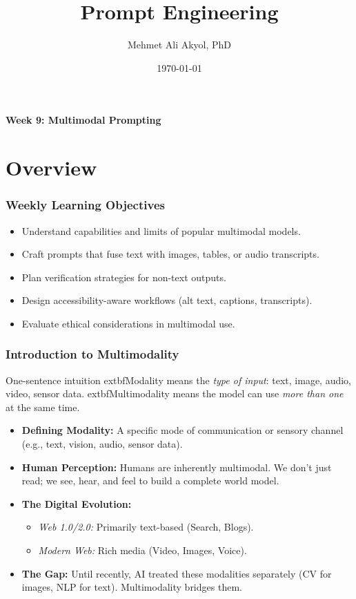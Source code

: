\documentclass{beamer}
\title{Prompt Engineering}
\author{Mehmet Ali Akyol, PhD}
\institute{Ankara Medipol University}
\date{\today}
\begin{document}
\begin{frame}
    \titlepage
    \begin{center}
        \vspace{1cm}
        \textbf{Week 9: Multimodal Prompting}
    \end{center}
\end{frame}

\section{Overview}

\begin{frame}
    \frametitle{Weekly Learning Objectives}
    \begin{itemize}
        \item Understand capabilities and limits of popular multimodal models.
        \item Craft prompts that fuse text with images, tables, or audio transcripts.
        \item Plan verification strategies for non-text outputs.
        \item Design accessibility-aware workflows (alt text, captions, transcripts).
        \item Evaluate ethical considerations in multimodal use.
    \end{itemize}
\end{frame}

\begin{frame}
    \frametitle{Introduction to Multimodality}
    \begin{block}{One-sentence intuition}
        	extbf{Modality} means the \textit{type of input}: text, image, audio, video, sensor data.
        	extbf{Multimodality} means the model can use \textit{more than one} at the same time.
    \end{block}
    \begin{itemize}
        \item \textbf{Defining Modality:} A specific mode of communication or sensory channel (e.g., text, vision, audio, sensor data).
        \item \textbf{Human Perception:} Humans are inherently multimodal. We don't just read; we see, hear, and feel to build a complete world model.
        \item \textbf{The Digital Evolution:}
        \begin{itemize}
            \item \textit{Web 1.0/2.0:} Primarily text-based (Search, Blogs).
            \item \textit{Modern Web:} Rich media (Video, Images, Voice).
        \end{itemize}
        \item \textbf{The Gap:} Until recently, AI treated these modalities separately (CV for images, NLP for text). Multimodality bridges them.
    \end{itemize}
\end{frame}
\end{document}

